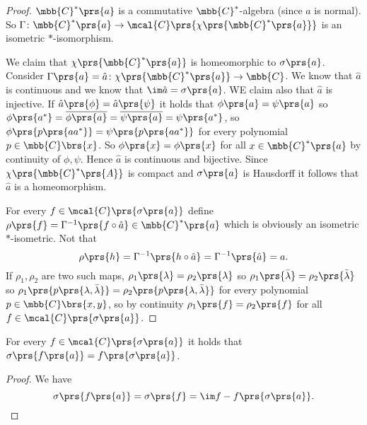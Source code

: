 \documentclass[10pt, twoside]{book}
\begin{document}
\begin{proof}
$\mbb{C}^*\prs{a}$ is a commutative $\mbb{C}^*$-algebra (since $a$ is normal).
So $\Gamma \colon \mbb{C}^*\prs{a} \to \mcal{C}\prs{\chi\prs{\mbb{C}^*\prs{a}}}$ is an isometric $*$-isomorphism.

We claim that $\chi\prs{\mbb{C}^*\prs{a}}$ is homeomorphic to $\sigma\prs{a}$. Consider $\Gamma\prs{a} = \hat{a} \colon \chi\prs{\mbb{C}^*\prs{a}} \to \mbb{C}$. We know that $\hat{a}$ is continuous and we know that $\im \hat{a} = \sigma\prs{a}$. WE claim also that $\hat{a}$ is injective. If $\hat{a} \prs{\phi} = \hat{a} \prs{\psi}$ it holds that $\phi\prs{a} = \psi\prs{a}$ so $\phi\prs{a^*} = \overline{\phi\prs{a}} = \overline{\psi\prs{a}} = \psi\prs{a^*}$, so $\phi\prs{p\prs{a a^*}} = \psi\prs{p\prs{a a^*}}$ for every polynomial $p \in \mbb{C}\brs{x}$. So $\phi\prs{x} = \phi\prs{x}$ for all $x \in \mbb{C}^*\prs{a}$ by continuity of $\phi,\psi$.
Hence $\hat{a}$ is continuous and bijective. Since $\chi\prs{\mbb{C}^*\prs{A}}$ is compact and $\sigma\prs{a}$ is Hausdorff it follows that $\hat{a}$ is a homeomorphism.

For every $f \in \mcal{C}\prs{\sigma\prs{a}}$ define $\rho\prs{f} = \Gamma^{-1}\prs{f \circ \hat{a}} \in \mbb{C}^*\prs{a}$ which is obviously an isometric $*$-isometric.
Not that \[\rho\prs{h} = \Gamma^{-1}\prs{h \circ \hat{a}} = \Gamma^{-1}\prs{\hat{a}} = a\text{.}\]
If $\rho_1, \rho_2$ are two such maps, $\rho_1\prs{\lambda} = \rho_2\prs{\lambda}$ so $\rho_1\prs{\bar{\lambda}} = \rho_2\prs{\bar{\lambda}}$ so $\rho_1\prs{p\prs{\lambda, \bar{\lambda}}} = \rho_2\prs{p\prs{\lambda, \bar{\lambda}}}$ for every polynomial $p \in \mbb{C}\brs{x,y}$, so by continuity $\rho_1\prs{f} = \rho_2\prs{f}$ for all $f \in \mcal{C}\prs{\sigma\prs{a}}$.
\end{proof}

\begin{corollary}
For every $f \in \mcal{C}\prs{\sigma\prs{a}}$ it holds that $\sigma\prs{f\prs{a}} = f\prs{\sigma\prs{a}}$.
\end{corollary}

\begin{proof}
We have \[\sigma\prs{f\prs{a}} = \sigma\prs{f} = \im f - f\prs{\sigma\prs{a}} \text{.}\]
\end{proof}
\end{document}
